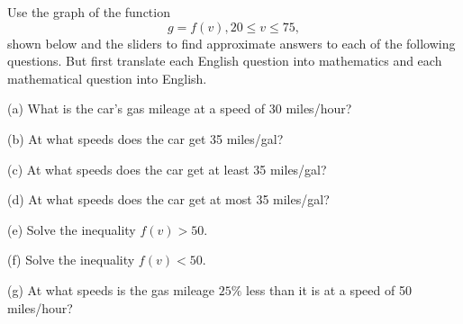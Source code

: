 \documentclass{ximera}
\begin{document}
\begin{example}  \label{ExFun3}
Use the graph of the function 
\[
    g = f(v) , 20\leq v \leq 75 ,
\]
shown below and the sliders to find approximate answers to each of the following questions. But first translate each English question into mathematics and each mathematical question into English.

(a) What is the car's gas mileage at a speed of 30 miles/hour?

(b) At what speeds does the car get 35 miles/gal?

(c)  At what speeds does the car get at least 35 miles/gal?

(d)  At what speeds does the car get at most 35 miles/gal?

(e) Solve the inequality $f(v)> 50$.

(f) Solve the inequality $f(v)<50$.

(g) At what speeds is the gas mileage $25\%$ less than it is at a speed of 50 miles/hour?



\begin{exploration}\label{exp:Fun3}


 
\begin{onlineOnly}
    \begin{center}
\end{center}
\end{onlineOnly}
\end{exploration}



\end{example}
\end{document}
